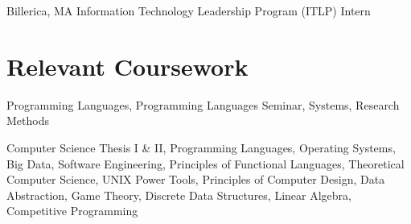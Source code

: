 \documentclass[10pt,letterpaper]{moderncv} %
\begin{document}
%
{Billerica, MA}%
{}%
{}%
{Information Technology Leadership Program (ITLP) Intern
%
}


\section{Relevant Coursework}

%
{}%
{}%
{}%
{Programming Languages, Programming Languages Seminar, Systems, Research
Methods%
\newline{}
}

%
{}%
{}%
{}%
{Computer Science Thesis I \& II, Programming Languages, Operating Systems, Big
Data, Software Engineering, Principles of Functional Languages, Theoretical
Computer Science, UNIX Power Tools, Principles of Computer Design, Data
Abstraction, Game Theory, Discrete Data Structures, Linear Algebra, Competitive
Programming
\newline{}
}




\end{document}
